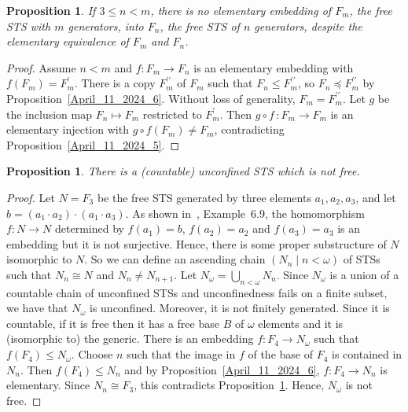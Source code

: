 \documentclass[a4paper, 11pt]{article}
\theoremstyle{note}
\newtheorem{prop}[thm]{Proposition}
\begin{document}
	\begin{prop}\label{April_11_2024_7} If $3\leq n<m$, there is no elementary embedding of $F_m$, the free STS with $m$ generators, into $F_n$, the free STS of $n$ generators, despite the elementary equivalence of $F_m$ and $F_n$.
	\end{prop}
	\begin{proof} Assume $n<m$ and $f:F_m\rightarrow F_n$ is an elementary embedding  with $f(F_m)=F_m^\prime$. There is a copy $F_m^{\prime \prime}$ of $F_m$ such that $F_n \leq F_m^{\prime \prime}$, so $F_n\preccurlyeq F_m^{\prime \prime}$ by Proposition~\ref{April_11_2024_6}. Without loss of generality, $F_m=F_m^{\prime \prime}$. Let $g$ be the inclusion map $F_n \mapsto F_m$ restricted to $F_m^\prime$. Then $ g \circ f\, : F_m \to F_m$ is an elementary injection with $g \circ f(F_m)\neq F_m$, contradicting Proposition~\ref{April_11_2024_5}.
	
	\end{proof}
	
	
	\begin{prop}   There is a (countable) unconfined STS which is not free.
	\end{prop}
	\begin{proof} Let $N=F_3$ be  the free STS generated by three elements  $a_1,a_2,a_3$, and let \\ $b = (a_1 \cdot a_2) \cdot (a_1 \cdot a_3)$. As shown in~\cite{barcas2},  Example~6.9, the homomorphism $f:N\rightarrow N$ determined by $f(a_1)=b$, $f(a_2)=a_2$ and $f(a_3)=a_3$ is an embedding but it is not surjective. Hence, there is some proper substructure of $N$ isomorphic to $N$. So we can define an ascending chain $(N_n\mid n<\omega)$ of STSs such that $N_n\cong N$ and $N_n\neq N_{n+1}$. Let $N_\omega=\bigcup_{n<\omega}N_n$. %
 Since $N_\omega$ is a union of a countable chain of unconfined STSs and unconfinedness fails on a finite subset, we have that $N_\omega$ is unconfined. Moreover, it is not finitely generated. Since it is countable, if it is free then it has a free base $B$ of $\omega$ elements and  it is (isomorphic to)  the generic. There is an embedding $f:F_4\rightarrow N_\omega$ such that  $f(F_4)\leq N_\omega$.  Choose $n$ such that the image in $f$ of  the base of $F_4$  is contained in $N_n$.  Then $f(F_4)\leq N_n$  and by Proposition~\ref{April_11_2024_6},  $f:F_4\rightarrow N_n$ is elementary. Since  $N_n\cong F_3$, this contradicts Proposition~\ref{April_11_2024_7}.
		Hence, $N_\omega$ is not free.
	\end{proof}
\end{document}
